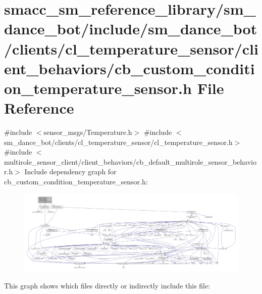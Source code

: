 \hypertarget{sm__dance__bot_2include_2sm__dance__bot_2clients_2cl__temperature__sensor_2client__behaviors_2cb15a3861006d3511ad9c098b2b40e8300}{}\section{smacc\+\_\+sm\+\_\+reference\+\_\+library/sm\+\_\+dance\+\_\+bot/include/sm\+\_\+dance\+\_\+bot/clients/cl\+\_\+temperature\+\_\+sensor/client\+\_\+behaviors/cb\+\_\+custom\+\_\+condition\+\_\+temperature\+\_\+sensor.h File Reference}
\label{sm__dance__bot_2include_2sm__dance__bot_2clients_2cl__temperature__sensor_2client__behaviors_2cb15a3861006d3511ad9c098b2b40e8300}
{\ttfamily \#include $<$sensor\+\_\+msgs/\+Temperature.\+h$>$}\newline
{\ttfamily \#include $<$sm\+\_\+dance\+\_\+bot/clients/cl\+\_\+temperature\+\_\+sensor/cl\+\_\+temperature\+\_\+sensor.\+h$>$}\newline
{\ttfamily \#include $<$multirole\+\_\+sensor\+\_\+client/client\+\_\+behaviors/cb\+\_\+default\+\_\+multirole\+\_\+sensor\+\_\+behavior.\+h$>$}\newline
Include dependency graph for cb\+\_\+custom\+\_\+condition\+\_\+temperature\+\_\+sensor.\+h\+:
\nopagebreak
\begin{figure}[H]
\begin{center}
\leavevmode
\includegraphics[width=350pt]{sm__dance__bot_2include_2sm__dance__bot_2clients_2cl__temperature__sensor_2client__behaviors_2cb0512d226814c4ca71999c471b5369c62}
\end{center}
\end{figure}
This graph shows which files directly or indirectly include this file\+:

